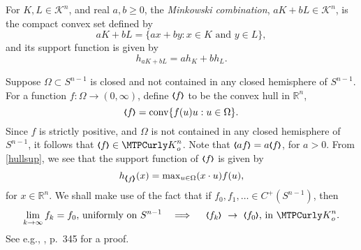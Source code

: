 \documentclass{cpamart1}     %
\makeatletter
\theoremstyle{definition}
\theoremstyle{remark}
\newlength\mylenA
\newcommand*\xoverline[2][0.75]{%
    \sbox{\myboxA}{$\m@th#2$}%
    \setbox\myboxB\null%
    \ht\myboxB=\ht\myboxA%
    \dp\myboxB=\dp\myboxA%
    \wd\myboxB=#1\wd\myboxA%
    \sbox\myboxB{$\m@th\overline{\copy\myboxB}$}%
    \setlength\mylenA{\the\wd\myboxA}%
    \addtolength\mylenA{-\the\wd\myboxB}%
    \ifdim\wd\myboxB<\wd\myboxA%
       \rlap{\hskip 0.5\mylenA\usebox\myboxB}{\usebox\myboxA}%
    \else
        \hskip -0.5\mylenA\rlap{\usebox\myboxA}{\hskip 0.5\mylenA\usebox\myboxB}%
    \fi}
\newcommand{\rn}{\mathbb R^n}
\newcommand{\sn}{S^{n-1}}
\newcommand{\kn}{\mathcal K^n}
\newcommand{\kno}{\mathcal K^n_o}
\newcommand{\conv}{\operatorname{conv}}
\newcommand{\bla}{\raise.2ex\hbox{$\scriptstyle\pmb \langle$}}
\newcommand{\bra}{\raise.2ex\hbox{$\scriptstyle\pmb \rangle$}}
\newcommand{\qsum}[1]{\,{+_{\negthinspace\kern-2pt \lower -2pt \hbox{$_{_{#1}}$}}}\,}
\newcommand{\thin}[1]{\negthinspace #1 \negthinspace}
\makeatother
\begin{document}


For $K,L\in\kn$, and real $a,b \ge 0$,
the {\it Minkowski combination}, $aK + bL\in\kn$, is the compact convex set defined by
\[
aK + bL = \{ax + by :\text{$x\in K$ and $y \in L$}\},
\]
and its support function is given by
\begin{equation*}
h_{aK+bL} = ah_K + bh_L.
\end{equation*}



Suppose $\Omega\subset\sn$ is closed and not contained in
any closed hemisphere of $\sn$. For a function 
$f:\Omega\to (0,\infty)$, define
$\bla f \bra$ to be the convex hull in $\rn$,
\[
\bla f \bra = \conv \{f(u)u : u\in\Omega \}.
\]
Since $f$ is strictly positive, and $\Omega$ is
not contained in any closed hemisphere of $\sn$, it follows that
$\bla f \bra \in\kno$. Note that
$\bla a f \bra = a \bla  f \bra$, for $a>0$.
From \eqref{hullsup}, we see that the support function of $\bla f \bra$ is given by
\begin{equation}\label{suphull}
h_{\bla f \bra}(x) = \max\nolimits_{u\in\Omega}   (x\cdot u)f(u),
\end{equation}
for $x\in\rn$.
We shall make use of the fact that if
$f_0, f_1,\ldots \in C^+(\sn)$, then
\begin{equation}\label{uniform1}
\text{$\lim_{k\to\infty}f_k = f_0$, uniformly on $\sn$\quad$\implies$\quad\
$\bla f_k \bra\ \to\ \bla f_0 \bra$, in $\kno$}.
\end{equation}
See e.g., \cite{HLYZ16}, p.\ 345 for a proof.




\end{document}
